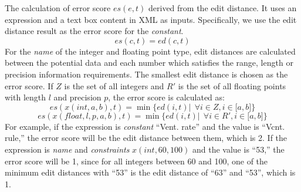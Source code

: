 The calculation of error score $es(e, t)$ derived from the edit 
distance. It uses an expression and a text box content in XML as inputs. 
Specifically, we use the edit distance result as 
the error score for the {\em constant}. 
\begin{equation}
es(c, t) = ed(c, t)
\end{equation}
For the {\em name} of the integer and floating point type, 
edit distances are calculated between the potential data and each number 
which satisfies the range, length or precision information requirements. 
The smallest edit distance is chosen as the error score. 
If $Z$ is the set of all integers and $R'$ is the set of 
all floating points with length $l$ and precision $p$, 
the error score is calculated as: 
\begin{equation}
es(x(int, a, b), t)=\min\{ed(i, t)| ~~\forall i \in Z, i \in \lbrack a, b \rbrack\}
\end{equation}
\begin{equation}
es(x(float, l, p, a, b), t)=\min\{ed(i, t)| ~~\forall i \in R', i \in \lbrack a, b \rbrack\}
\end{equation}
For example, if the expression is {\em constant} ``Vent. rate'' and 
the value is ``Vcnt. rule,''
the error score will be the edit distance between them, which is 2. 
If the expression is {\em name} and {\em constraints} $x(int, 60, 100)$ 
and the value is ``53,'' the error score will be 1, since for all integers 
between 60 and 100, one of the minimum edit distances with ``53'' is 
the edit distance of ``63'' and ``53'', which is 1. 

